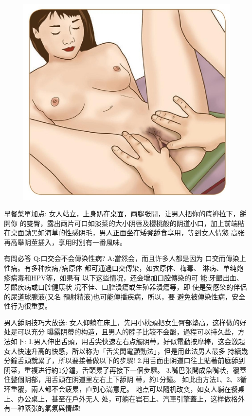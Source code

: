 \documentclass[12pt,UTF8]{ctexbook}
\begin{document}
\begin{figure}[htbp]
	\centering
	\includegraphics[width=0.7\linewidth]{23}
	\caption{}
	\label{fig:1}
\end{figure}

早餐菜單加点:
女人站立，上身趴在桌面，兩腿张開，让男人把你的底褲拉下，掰開你
的雙臀，露出兩片可口如淡菜的大小阴唇及櫻桃般的阴道小口，加上前端貼
在桌面黝黑如海草的性感阴毛，男人正面坐在矮凳舔食享用，等到女人情慾
高张再高舉阴莖插入，享用时別有一番風味。

有問必答
Q:口交会不会傳染性病?
A:當然会，而且许多人都是因为
口交而傳染上性病。有多种疾病/病原体
都可通過口交傳染，如衣原体、梅毒、
淋病、单纯皰疹病毒和HPV等，如果有
以下这些情况，还会增加口腔傳染的可
能:牙齦出血、牙齦疾病或口腔健康状
况不佳、口腔潰瘍或生殖器潰瘍等，即
使是受感染的伴侶的尿道球腺液(又名
預射精液)也可能傳播疾病，所以，要
避免被傳染性病，安全性行为很重要。

男人舔阴技巧大放送:
女人仰躺在床上，先用小枕頭把女生臀部墊高，这样做的好处是可以充分
曝露阴蒂的构造，且男人的脖子比较不会酸，過程可以持久些，方法如下:
1.男人伸出舌頭，用舌尖快速左右点觸阴蒂，好似電動按摩棒，这会激起
女人快速升高的快感，所以称为「舌尖閃電顫動法」，但是用此法男人最多
持續幾分鐘舌頭就累了，所以要接著做以下的步驟!
2.用舌面由阴道口往上貼著前庭舔到阴蒂，重複进行約1分鐘，舌頭累了再接下一個步驟。
3.嘴巴张開成魚嘴状，覆蓋住整個阴部，用舌頭在阴道里左右上下舔阴
蒂，約1分鐘。
如此由方法1、2、3循环重覆，兩人都不会疲累，直到心滿意足。
地点可以隨机改变，如女人躺在餐桌上、办公桌上，甚至在戶外无人
处，可躺在岩石上、汽車引擎蓋上，这样做格外有一种緊张的氣氛與情趣!
\end{document}
